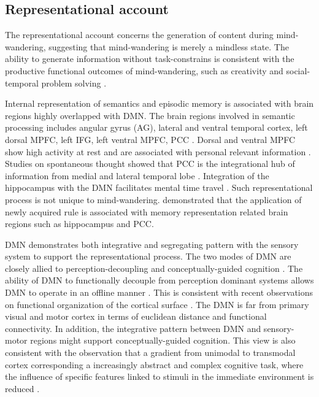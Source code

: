\subsection{Representational account}

The representational account concerns the generation of content during mind-wandering, suggesting that mind-wandering is merely a mindless state. The ability to generate information without task-constrains is consistent with the productive functional outcomes of mind-wandering, such as creativity \cite{Baird2012,Smeekens2016} and social-temporal problem solving \cite{RubyPlos2013,PoerioFrontiers2016,Medea2016}. 

Internal representation of semantics and episodic memory is associated with brain regions highly overlapped with DMN. The brain regions involved in semantic processing includes angular gyrus (AG), lateral and ventral temporal cortex, left dorsal MPFC, left IFG, left ventral MPFC, PCC \cite<see meta-analysis from>{Binder2009}. Dorsal and ventral MPFC show high activity at rest and are associated with personal relevant information \cite{Gusnard2001}. Studies on spontaneous thought showed that PCC is the integrational hub of information from medial and lateral temporal lobe \cite{Smallwood2016}. Integration of the hippocampus with the DMN facilitates mental time travel \cite{Karapanagiotidis2017}. Such representational process is not unique to mind-wandering.  demonstrated that the application of newly acquired rule is associated with memory representation related brain regions such as hippocampus and PCC. 

DMN demonstrates both integrative and segregating pattern with the sensory system to support the representational process. The two modes of DMN are closely allied to perception-decoupling and conceptually-guided cognition \cite{Murphy2018}. The ability of DMN to functionally decouple from perception dominant systems allows DMN to operate in an offline manner \cite{Smallwood2013}. This is consistent with recent observations on functional organization of the cortical surface \cite{Margulies2016}. The DMN is far from primary visual and motor cortex in terms of euclidean distance and functional connectivity. In addition, the integrative pattern between DMN and sensory-motor regions might support conceptually-guided cognition. This view is also consistent with the observation that a gradient from unimodal to transmodal cortex \cite{Margulies2016} corresponding a increasingly abstract and complex cognitive task, where the influence of specific features linked to stimuli in the immediate environment is reduced \cite{Mesulam1998,Buckner2013,Margulies2016}.


